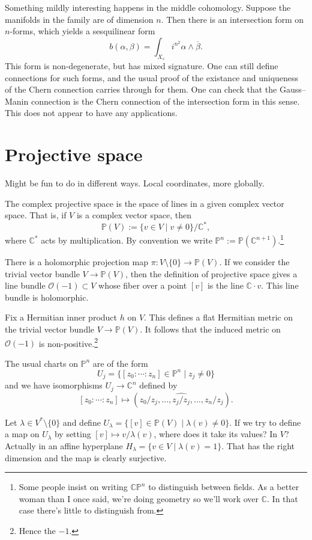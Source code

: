 \documentclass[11pt]{article}
\newcommand{\kk}[1]{\mathbb{#1}}
\newcommand{\cc}[1]{\mathcal{#1}}
\begin{document}
Something mildly interesting happens in the middle cohomology. Suppose the manifolds in the family are of dimension $n$. Then there is an intersection form on $n$-forms, which yields a sesquilinear form
$$
b(\alpha, \beta) = \int_{X_s} i^{n^2} \alpha \wedge \overline{\beta}.
$$
This form is non-degenerate, but has mixed signature. One can still define connections for such forms, and the usual proof of the existance and uniqueness of the Chern connection carries through for them. One can check that the Gauss--Manin connection is the Chern connection of the intersection form in this sense. This does not appear to have any applications.


\section{Projective space}
\label{sec:orgcfabeed}

Might be fun to do in different ways. Local coordinates, more globally.

The complex projective space is the space of lines in a given complex vector space. That is, if $V$ is a complex vector space, then
$$
\kk P(V) := \{ v \in V \mid v \not= 0 \} / \kk C^*,
$$
where $\kk C^*$ acts by multiplication. By convention we write $\kk P^n := \kk P(\kk C^{n+1})$.\footnote{Some people insist on writing $\kk C \kk P^n$ to distinguish between fields. As a better woman than I once said, we're doing geometry so we'll work over $\kk C$. In that case there's little to distinguish from.}

There is a holomorphic projection map $\pi : V \setminus \{0\} \to \kk P(V)$. If we consider the trivial vector bundle $V \to \kk P(V)$, then the definition of projective space gives a line bundle $\cc O(-1) \subset V$ whose fiber over a point $[v]$ is the line $\kk C \cdot v$. This line bundle is holomorphic.

Fix a Hermitian inner product $h$ on $V$. This defines a flat Hermitian metric on the trivial vector bundle $V \to \kk P(V)$. It follows that the induced metric on $\cc O(-1)$ is non-positive.\footnote{Hence the $-1$.}

The usual charts on $\kk P^n$ are of the form
$$
U_j = \{[z_0 : \cdots : z_n] \in \kk P^{n} \mid z_j \not= 0\}
$$
and we have isomorphisms $U_j \to \kk C^n$ defined by
$$
[z_0 : \cdots : z_n] \mapsto (z_0/z_j, \ldots, \widehat{z_j/z_j}, \ldots, z_n/z_j).
$$

Let $\lambda \in V^* \setminus \{0\}$ and define $U_\lambda = \{ [v] \in \kk P(V) \mid \lambda(v) \not= 0 \}$. If we try to define a map on $U_\lambda$ by setting $[v] \mapsto v / \lambda(v)$, where does it take its values? In $V$? Actually in an affine hyperplane $H_\lambda = \{v \in V \mid \lambda(v) = 1 \}$. That has the right dimension and the map is clearly surjective.
\end{document}
